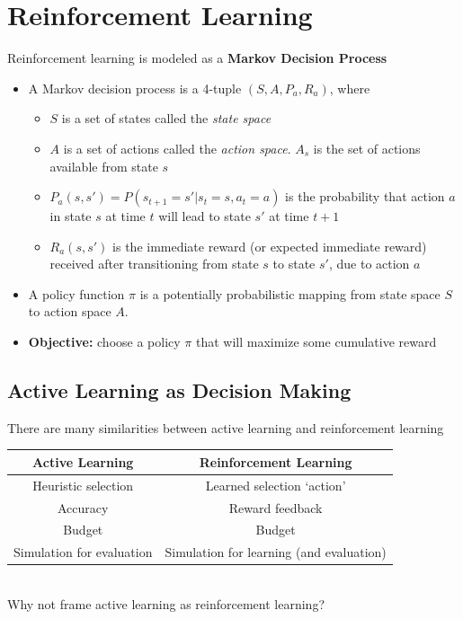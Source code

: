 \documentclass[10pt]{article}
\begin{document}
\section*{Reinforcement Learning}
Reinforcement learning is modeled as a \textbf{Markov Decision Process}
\begin{itemize}
	\item A Markov decision process is a 4-tuple $(S, A, P_a, R_a)$, where
	\begin{itemize}
	    \item $S$ is a set of states called the \textit{state space}
	    \item $A$ is a set of actions called the \textit{action space}.  $A_s$ is the set of actions available from state $s$
        \item $P_a(s, s') = P(s_{t + 1} = s' | s_t = s, a_t = a)$ is the probability that action $a$ in state $s$ at time $t$ will lead to state $s'$ at time $t + 1$
        \item $R_a(s, s')$ is the immediate reward (or expected immediate reward) received after transitioning from state $s$ to state $s'$, due to action $a$
    \end{itemize}
    \item A policy function $\pi$ is a potentially probabilistic mapping from state space $S$ to action space $A$.
    \item \textbf{Objective:} choose a policy $\pi$ that will maximize some cumulative reward
\end{itemize}

\subsection*{Active Learning as Decision Making}
There are many similarities between active learning and reinforcement learning
\begin{center}
\begin{tabular}{|c|c|}
\hline \textbf{Active Learning} & \textbf{Reinforcement Learning} \\ \hline
Heuristic selection & Learned selection `action' \\ \hline
Accuracy & Reward feedback \\ \hline
Budget & Budget \\ \hline
Simulation for evaluation & Simulation for learning (and evaluation) \\ \hline
\end{tabular}\\ \vspace{1em}
Why not frame active learning as reinforcement learning?
\end{center}
\end{document}

